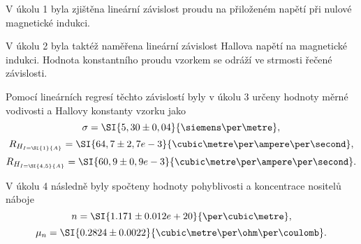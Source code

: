 \documentclass[0-protokol.tex]{subfiles}
\begin{document}
V úkolu 1 byla zjištěna lineární závislost proudu na přiloženém napětí při nulové magnetické indukci.

V úkolu 2 byla taktéž naměřena lineární závislost Hallova napětí na magnetické indukci. Hodnota konstantního proudu vzorkem se odráží ve strmosti řečené závislosti.

Pomocí lineárních regresí těchto závislostí byly v úkolu 3 určeny hodnoty měrné vodivosti a Hallovy konstanty vzorku jako
$$\sigma = \SI{5,30 \pm 0,04}{\siemens\per\metre},$$
$$R_{H_{I = \SI{1}{A}}} = \SI{64,7 \pm 2,7 e-3}{\cubic\metre\per\ampere\per\second},$$
$$R_{H_{I = \SI{4,5}{A}}} = \SI{60,9 \pm 0,9 e-3}{\cubic\metre\per\ampere\per\second}.$$

V úkolu 4 následně byly spočteny hodnoty pohyblivosti a koncentrace nositelů náboje
$$n = \SI{1.171 \pm 0.012 e+20}{\per\cubic\metre},$$
$$\mu_n = \SI{0.2824 \pm 0.0022}{\cubic\metre\per\ohm\per\coulomb}.$$
\end{document}
